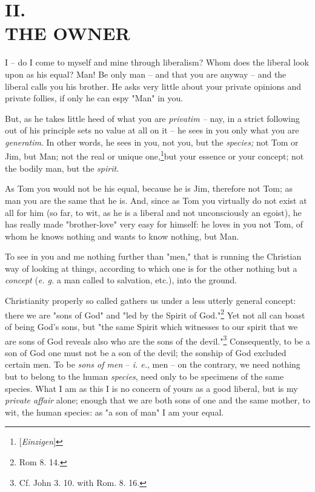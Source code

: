
\chapter[II. The Owner]{\centering II.\\
THE OWNER}

I -- do I come to myself and mine through liberalism? Whom does the liberal 
look upon as his equal? Man! Be only man -- and that you are anyway -- and the 
liberal calls you his brother. He asks very little about your private opinions 
and private follies, if only he can espy "{}Man"{} in you.

But, as he takes little heed of what you are \textit{privatim --} nay, in a 
strict following out of his principle sets no value at all on it -- he sees in 
you only what you are \textit{generatim}. In other words, he sees in you, not 
you, but the \textit{species;} not Tom or Jim, but Man; not the real or unique 
one,\footnote{[\textit{Einzigen}] }but your essence or your concept; not the 
bodily man, but the \textit{spirit}.

As Tom you would not be his equal, because he is Jim, therefore not Tom; as 
man you are the same that he is. And, since as Tom you virtually do not exist 
at all for him (so far, to wit, as he is a liberal and not unconsciously an 
egoist), he has really made "{}brother-love"{} very easy for himself: he loves 
in you not Tom, of whom he knows nothing and wants to know nothing, but Man.

To see in you and me nothing further than "{}men,"{} that is running the 
Christian way of looking at things, according to which one is for the other 
nothing but a \textit{concept} (\textit{e. g.} a man called to salvation, 
etc.), into the ground.

Christianity properly so called gathers us under a less utterly general 
concept: there we are "{}sons of God"{} and "{}led by the Spirit of 
God."{}\footnote{Rom 8. 14.} Yet not all can boast of being God's sons, but 
"{}the same Spirit which witnesses to our spirit that we are sons of God 
reveals also who are the sons of the devil."{}\footnote{Cf. John 3. 10. with 
Rom. 8. 16.} Consequently, to be a son of God one must not be a son of the 
devil; the sonship of God excluded certain men. To be \textit{sons of men} -- 
\textit{i. e.}, men -- on the contrary, we need nothing but to belong to the 
human \textit{species}, need only to be specimens of the same species. What I 
am as this I is no concern of yours as a good liberal, but is my 
\textit{private affair} alone; enough that we are both sons of one and the 
same mother, to wit, the human species: as "{}a son of man"{} I am your equal.

